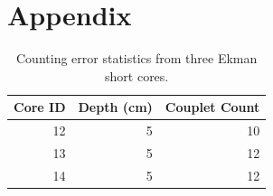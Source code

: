 \documentclass[
  letterpaper,
  DIV=11,
  numbers=noendperiod]{scrartcl}
\begin{document}
\pagebreak

\hypertarget{appendix}{%
\section{Appendix}\label{appendix}}

\hypertarget{tbl-ekErr}{}
\begin{table}
\caption{\label{tbl-ekErr}Counting error statistics from three Ekman short cores. }\tabularnewline

\centering
\begin{tabular}{r|r|r}
\hline
Core ID & Depth (cm) & Couplet Count\\
\hline
12 & 5 & 10\\
\hline
13 & 5 & 12\\
\hline
14 & 5 & 12\\
\hline
\end{tabular}
\end{table}
\end{document}
